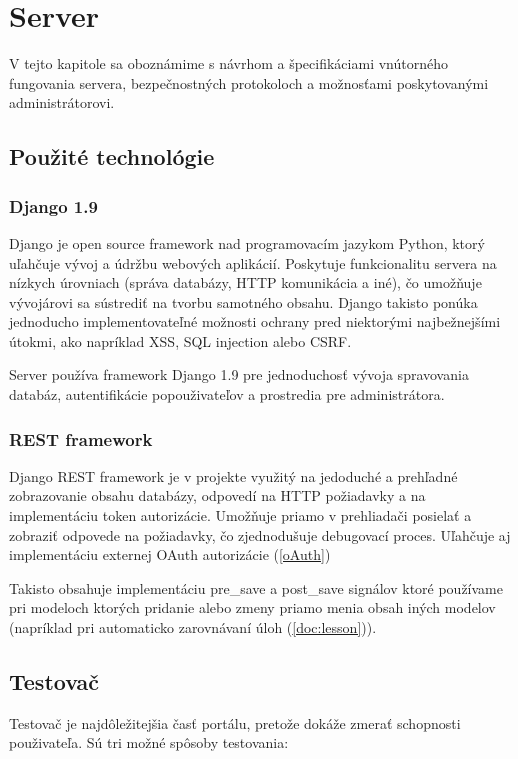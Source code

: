 \chapter{Server}

\label{kap:server}

V tejto kapitole sa oboznámime s návrhom a špecifikáciami vnútorného fungovania servera,
bezpečnostných protokoloch a možnosťami poskytovanými administrátorovi.

\section{Použité technológie}

\subsection{Django 1.9}
Django je open source framework nad programovacím jazykom Python, ktorý uľahčuje vývoj a údržbu webových aplikácií.
Poskytuje funkcionalitu servera na nízkych úrovniach (správa databázy, HTTP komunikácia a iné), čo umožňuje vývojárovi sa sústrediť na tvorbu samotného obsahu.
Django takisto ponúka jednoducho implementovateľné možnosti ochrany pred niektorými najbežnejšími útokmi, ako napríklad XSS, SQL injection alebo CSRF.

Server používa framework Django 1.9 pre jednoduchosť vývoja spravovania databáz, autentifikácie popouživateľov a prostredia pre administrátora.
\subsection{REST framework}
Django REST framework je v projekte využitý na jedoduché a prehľadné zobrazovanie obsahu databázy, odpovedí na HTTP požiadavky a na implementáciu
token autorizácie. Umožňuje priamo v prehliadači posielať a zobraziť odpovede na požiadavky, čo zjednodušuje debugovací proces. Uľahčuje aj implementáciu externej OAuth
autorizácie (\ref{oAuth})

Takisto obsahuje implementáciu pre\_save a post\_save signálov ktoré používame pri
modeloch ktorých pridanie alebo zmeny priamo menia obsah iných modelov
(napríklad pri automaticko zarovnávaní úloh (\ref{doc:lesson})).
\newpage
\section{Testovač}
\label{testovace}
Testovač je najdôležitejšia časť portálu, pretože dokáže zmerať schopnosti použivateľa. Sú tri možné spôsoby testovania:
